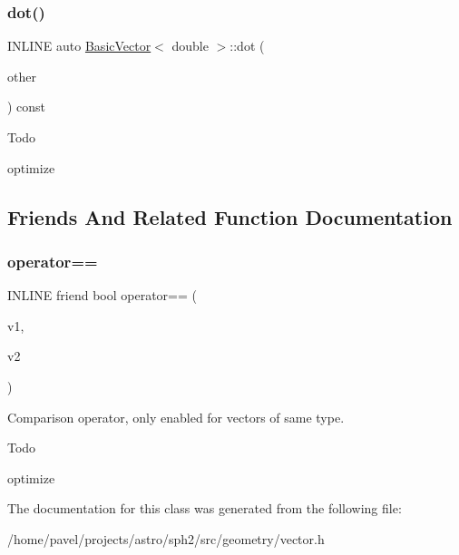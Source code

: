 \subsubsection{\texorpdfstring{dot()}{dot()}}
{\footnotesize\ttfamily I\+N\+L\+I\+NE auto \hyperlink{classBasicVector}{Basic\+Vector}$<$ double $>$\+::dot (\begin{DoxyParamCaption}\item[{const \hyperlink{classBasicVector}{Basic\+Vector}$<$ double $>$ \&}]{other }\end{DoxyParamCaption}) const\hspace{0.3cm}{\ttfamily [inline]}}

\begin{DoxyRefDesc}{Todo}
\item[\hyperlink{todo__todo000012}{Todo}]optimize \end{DoxyRefDesc}


\subsection{Friends And Related Function Documentation}
\hypertarget{classBasicVector_3_01double_01_4_a89893ab07524d683177877fc3f1a34d6}{}\label{classBasicVector_3_01double_01_4_a89893ab07524d683177877fc3f1a34d6} 
\subsubsection{\texorpdfstring{operator==}{operator==}}
{\footnotesize\ttfamily I\+N\+L\+I\+NE friend bool operator== (\begin{DoxyParamCaption}\item[{const \hyperlink{classBasicVector}{Basic\+Vector}$<$ double $>$ \&}]{v1,  }\item[{const \hyperlink{classBasicVector}{Basic\+Vector}$<$ double $>$ \&}]{v2 }\end{DoxyParamCaption})\hspace{0.3cm}{\ttfamily [friend]}}



Comparison operator, only enabled for vectors of same type. 

\begin{DoxyRefDesc}{Todo}
\item[\hyperlink{todo__todo000011}{Todo}]optimize \end{DoxyRefDesc}


The documentation for this class was generated from the following file\+:\begin{DoxyCompactItemize}
\item 
/home/pavel/projects/astro/sph2/src/geometry/vector.\+h\end{DoxyCompactItemize}

